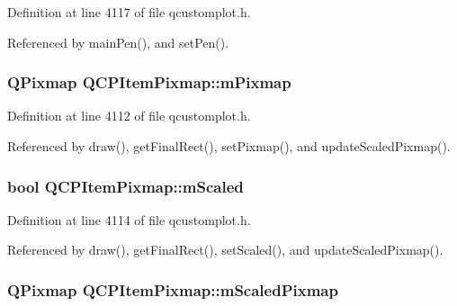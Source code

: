 Definition at line 4117 of file qcustomplot.\+h.



Referenced by main\+Pen(), and set\+Pen().

\hypertarget{class_q_c_p_item_pixmap_a1396cce7f26c7b8e9512906284380c4d}{}
\subsubsection[{m\+Pixmap}]{\setlength{\rightskip}{0pt plus 5cm}Q\+Pixmap Q\+C\+P\+Item\+Pixmap\+::m\+Pixmap\hspace{0.3cm}{\ttfamily [protected]}}\label{class_q_c_p_item_pixmap_a1396cce7f26c7b8e9512906284380c4d}


Definition at line 4112 of file qcustomplot.\+h.



Referenced by draw(), get\+Final\+Rect(), set\+Pixmap(), and update\+Scaled\+Pixmap().

\hypertarget{class_q_c_p_item_pixmap_a8fe670a529cd46a9b8afd9fc1203bc3f}{}
\subsubsection[{m\+Scaled}]{\setlength{\rightskip}{0pt plus 5cm}bool Q\+C\+P\+Item\+Pixmap\+::m\+Scaled\hspace{0.3cm}{\ttfamily [protected]}}\label{class_q_c_p_item_pixmap_a8fe670a529cd46a9b8afd9fc1203bc3f}


Definition at line 4114 of file qcustomplot.\+h.



Referenced by draw(), get\+Final\+Rect(), set\+Scaled(), and update\+Scaled\+Pixmap().

\hypertarget{class_q_c_p_item_pixmap_a2ebc66e15b9f1264563d58f29ba1bc00}{}
\subsubsection[{m\+Scaled\+Pixmap}]{\setlength{\rightskip}{0pt plus 5cm}Q\+Pixmap Q\+C\+P\+Item\+Pixmap\+::m\+Scaled\+Pixmap\hspace{0.3cm}{\ttfamily [protected]}}\label{class_q_c_p_item_pixmap_a2ebc66e15b9f1264563d58f29ba1bc00}


